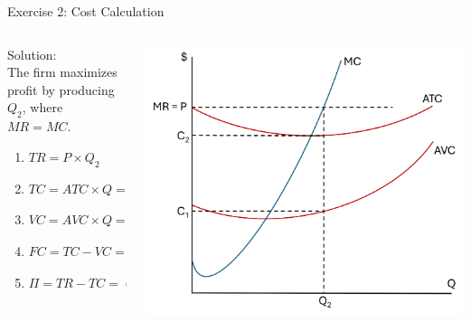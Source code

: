 \documentclass[9pt]{beamer}
\begin{document}
\begin{frame}{Exercise 2: Cost Calculation}
    \begin{columns}[c]
        \begin{column}{0.5\textwidth}
        Solution:\\
        \vspace{10pt}
        The firm maximizes profit by producing $Q_2$, where $MR = MC$.
        \vspace{5pt}
            \begin{enumerate}
                \item $TR = P \times Q_2$
                \item $TC = ATC \times Q = C_2 \times Q_2$
                \item $VC = AVC \times Q = C_1 \times Q_2$
                \item $FC = TC - VC = (C_2 - C_1) \times Q_2$
                \item $\Pi = TR - TC = (P - C_2) \times Q_2$
            \end{enumerate}
        \end{column}
        \begin{column}{0.5\textwidth}
            \includegraphics[width=\linewidth]{cost_exercise.png}
        \end{column}
    \end{columns}
\end{frame}
\end{document}
